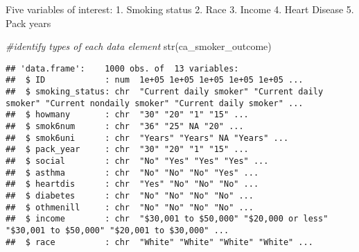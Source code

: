 \documentclass[
]{article}
\newenvironment{Shaded}{\begin{snugshade}}{\end{snugshade}}
\newcommand{\CommentTok}[1]{\textcolor[rgb]{0.56,0.35,0.01}{\textit{#1}}}
\newcommand{\FunctionTok}[1]{\textcolor[rgb]{0.00,0.00,0.00}{#1}}
\newcommand{\NormalTok}[1]{#1}
\begin{document}
Five variables of interest: 1. Smoking status 2. Race 3. Income 4. Heart
Disease 5. Pack years

\begin{Shaded}
\begin{Highlighting}[]
\CommentTok{\#identify types of each data element}
\FunctionTok{str}\NormalTok{(ca\_smoker\_outcome)}
\end{Highlighting}
\end{Shaded}

\begin{verbatim}
## 'data.frame':    1000 obs. of  13 variables:
##  $ ID            : num  1e+05 1e+05 1e+05 1e+05 1e+05 ...
##  $ smoking_status: chr  "Current daily smoker" "Current daily smoker" "Current nondaily smoker" "Current daily smoker" ...
##  $ howmany       : chr  "30" "20" "1" "15" ...
##  $ smok6num      : chr  "36" "25" NA "20" ...
##  $ smok6uni      : chr  "Years" "Years" NA "Years" ...
##  $ pack_year     : chr  "30" "20" "1" "15" ...
##  $ social        : chr  "No" "Yes" "Yes" "Yes" ...
##  $ asthma        : chr  "No" "No" "No" "Yes" ...
##  $ heartdis      : chr  "Yes" "No" "No" "No" ...
##  $ diabetes      : chr  "No" "No" "No" "No" ...
##  $ othmenill     : chr  "No" "No" "No" "No" ...
##  $ income        : chr  "$30,001 to $50,000" "$20,000 or less" "$30,001 to $50,000" "$20,001 to $30,000" ...
##  $ race          : chr  "White" "White" "White" "White" ...
\end{verbatim}
\end{document}
